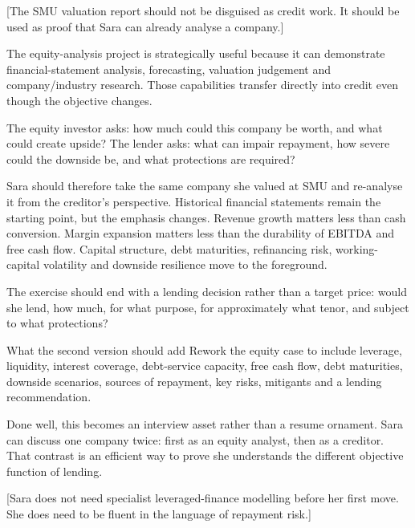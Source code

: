 \documentclass[theme=editorial,publication-type=feature-article]{reportkit}
\begin{document}
[The SMU valuation report should not be disguised as credit work. It should be used as proof that Sara can already analyse a company.]

\begin{featurecolumns}
The equity-analysis project is strategically useful because it can demonstrate financial-statement analysis, forecasting, valuation judgement and company/industry research. Those capabilities transfer directly into credit even though the objective changes.

The equity investor asks: how much could this company be worth, and what could create upside? The lender asks: what can impair repayment, how severe could the downside be, and what protections are required?

Sara should therefore take the same company she valued at SMU and re-analyse it from the creditor's perspective. Historical financial statements remain the starting point, but the emphasis changes. Revenue growth matters less than cash conversion. Margin expansion matters less than the durability of EBITDA and free cash flow. Capital structure, debt maturities, refinancing risk, working-capital volatility and downside resilience move to the foreground.

The exercise should end with a lending decision rather than a target price: would she lend, how much, for what purpose, for approximately what tenor, and subject to what protections?

\begin{featuresidebar}{What the second version should add}
Rework the equity case to include leverage, liquidity, interest coverage, debt-service capacity, free cash flow, debt maturities, downside scenarios, sources of repayment, key risks, mitigants and a lending recommendation.
\end{featuresidebar}

Done well, this becomes an interview asset rather than a resume ornament. Sara can discuss one company twice: first as an equity analyst, then as a creditor. That contrast is an efficient way to prove she understands the different objective function of lending.
\end{featurecolumns}

[Sara does not need specialist leveraged-finance modelling before her first move. She does need to be fluent in the language of repayment risk.]
\end{document}
